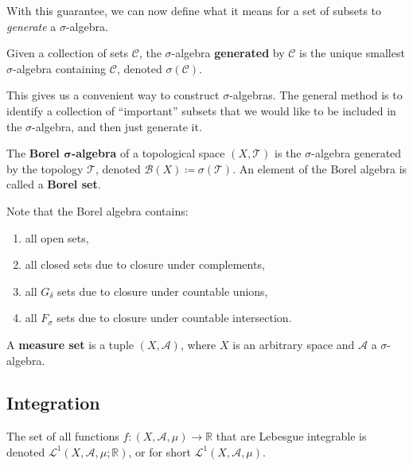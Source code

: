   With this guarantee, we can now define what it means for a set of subsets to \textit{generate} a $\sigma$-algebra. 

  \begin{definition}
    Given a collection of sets $\mathscr{C}$, the $\sigma$-algebra \textbf{generated} by $\mathscr{C}$ is the unique smallest $\sigma$-algebra containing $\mathscr{C}$, denoted $\sigma(\mathscr{C})$. 
  \end{definition} 

  This gives us a convenient way to construct $\sigma$-algebras. The general method is to identify a collection of ``important'' subsets that we would like to be included in the $\sigma$-algebra, and then just generate it.   

  \begin{definition}
    The \textbf{Borel $\boldsymbol{\sigma}$-algebra} of a topological space $(X, \mathscr{T})$ is the $\sigma$-algebra generated by the topology $\mathscr{T}$, denoted $\mathcal{B}(X) \coloneqq \sigma(\mathscr{T})$. An element of the Borel algebra is called a \textbf{Borel set}. 
  \end{definition}

  Note that the Borel algebra contains: 
  \begin{enumerate}
    \item all open sets, 
    \item all closed sets due to closure under complements, 
    \item all $G_\delta$ sets due to closure under countable unions, 
    \item all $F_\sigma$ sets due to closure under countable intersection. 
  \end{enumerate}

  \begin{definition}
    A \textbf{measure set} is a tuple $(X, \mathcal{A})$, where $X$ is an arbitrary space and $\mathcal{A}$ a $\sigma$-algebra. 
  \end{definition}

\subsection{Integration}

  \begin{definition}
    The set of all functions $f: (X, \mathcal{A}, \mu) \longrightarrow \mathbb{R}$ that are Lebesgue integrable is denoted $\mathcal{L}^1(X, \mathcal{A}, \mu; \mathbb{R})$, or for short $\mathcal{L}^1(X, \mathcal{A}, \mu)$. 
  \end{definition}

